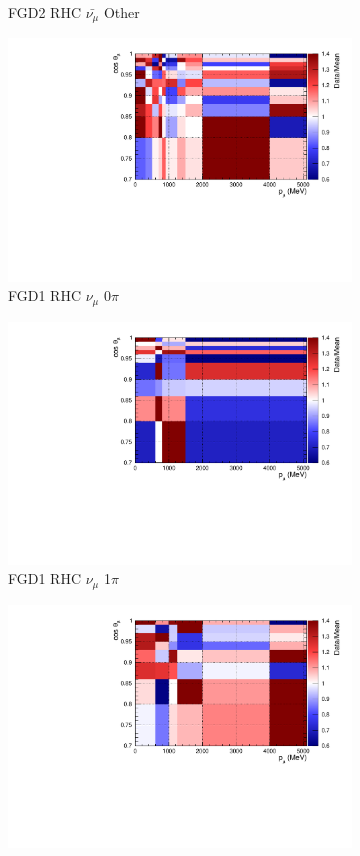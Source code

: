 \begin{figure}
\begin{subfigure}{.32\textwidth}
  \caption{FGD2 RHC $\bar{\nu_{\mu}}$ Other}
  \label{fig:postpred_FGD2_anti-numuCC_other}
\end{subfigure}
\begin{subfigure}{.32\textwidth}
  \centering
  \includegraphics[width=0.85\linewidth]{figs/postpred_FGD1_NuMuBkg_CC0pi_in_AntiNu_Mode.pdf}
  \caption{FGD1 RHC $\nu_{\mu}$ 0$\pi$}
  \label{fig:postpred_FGD1_NuMuBkg_CC0pi_in_AntiNu_Mode}
\end{subfigure}
\begin{subfigure}{.32\textwidth}
  \centering
  \includegraphics[width=0.85\linewidth]{figs/postpred_FGD1_NuMuBkg_CC1pi_in_AntiNu_Mode.pdf}
  \caption{FGD1 RHC $\nu_{\mu}$ 1$\pi$}
  \label{fig:postpred_FGD1_NuMuBkg_CC1pi_in_AntiNu_Mode}
\end{subfigure}
\begin{subfigure}{.32\textwidth}
  \centering
  \includegraphics[width=0.85\linewidth]{figs/postpred_FGD1_NuMuBkg_CCOther_in_AntiNu_Mode.pdf}

\end{subfigure}
\end{figure}
